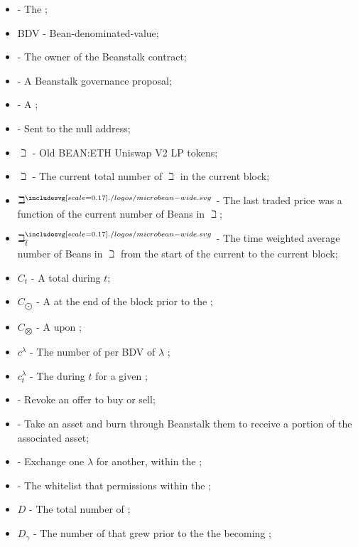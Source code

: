 \documentclass[class=article, crop=false]{standalone}
\begin{document}
\begin{itemize}[topsep=0pt, itemsep=3pt,leftmargin=16pt]
    \item[]  - The ;
    \item[] BDV - Bean-denominated-value;
    \item[]  - The owner of the Beanstalk contract;
    \item[]  - A Beanstalk governance proposal;
    \item[]  - A ;
    \item[]  - Sent to the null address;
    \item[] $\beth$ - Old BEAN:ETH Uniswap V2 LP tokens;
    \item[] $\beth$ - The current total number of $\beth$ in the current block;
    \item[] $\beth^{\bean}$ - The last traded price was a function of the current number of Beans in $\beth$;
    \item[] $\beth_{\overline{t}}^{\bean}$ - The time weighted average number of Beans in $\beth$ from the start of the current  to the current block;
    \item[] $C_t$ - A  total  during $t$;
    \item[] $C_{\bigodot}$ - A   at the end of the block prior to the ;
    \item[] $C_{\bigotimes}$ - A   upon ;
    \item[] $c^{\lambda}$ - The number of  per BDV of $\lambda$ ;
    \item[] $c_{t}^{\lambda}$ - The  during $t$ for a given ;
    \item[]  - Revoke an offer to buy or sell;
    \item[]  - Take an  asset and burn through Beanstalk them to receive a portion of the associated  asset;
    \item[]  - Exchange one  $\lambda$ for another, within the ;
    \item[]   - The whitelist that permissions  within the ;
    \item[] $D$ - The total number of  ;
    \item[] $D_{\gamma}$ - The number of   that grew prior to the the  becoming ;

\end{itemize}
\end{document}
